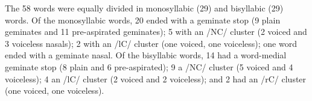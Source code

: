 \documentclass[11pt,a4paper,openany]{memoir}\usepackage[]{graphicx}\usepackage[]{color}
\begin{document}
The 58 words were equally divided in monosyllabic (29) and bisyllabic (29) words.
Of the monosyllabic words, 20 ended with a geminate stop (9 plain geminates and 11 pre-aspirated geminates); 5 with an /NC/ cluster (2 voiced and 3 voiceless nasals); 2 with an /lC/ cluster (one voiced, one voiceless); one word ended with a geminate nasal.
Of the bisyllabic words, 14 had a word-medial geminate stop (8 plain and 6 pre-aspirated); 9 a /NC/ cluster (5 voiced and 4 voiceless); 4 an /lC/ cluster (2 voiced and 2 voiceless); and 2 had an /rC/ cluster (one voiced, one voiceless).




\vspace{2em}

\label{t:wordlist}
\end{document}
